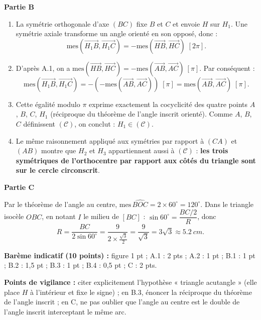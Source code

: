 \documentclass[11pt]{article}
\begin{document}
\begin{corrige}
\textbf{Partie B}
\begin{enumerate}
\item La symétrie orthogonale d'axe $(BC)$ fixe $B$ et $C$ et envoie $H$ sur $H_1$. Une symétrie axiale transforme un angle orienté en son opposé, donc :
\[ \mathrm{mes}(\overrightarrow{H_1B}, \overrightarrow{H_1C}) = -\mathrm{mes}(\overrightarrow{HB}, \overrightarrow{HC}) \; [2\pi]. \]
\item D'après A.1, on a $\mathrm{mes}(\overrightarrow{HB}, \overrightarrow{HC}) = -\mathrm{mes}(\overrightarrow{AB}, \overrightarrow{AC})\ [\pi]$. Par conséquent :
\[ \mathrm{mes}(\overrightarrow{H_1B}, \overrightarrow{H_1C}) = -(-\mathrm{mes}(\overrightarrow{AB}, \overrightarrow{AC})) \; [\pi] = \mathrm{mes}(\overrightarrow{AB}, \overrightarrow{AC}) \; [\pi]. \]
\item Cette égalité modulo $\pi$ exprime exactement la cocyclicité des quatre points $A$, $B$, $C$, $H_1$ (réciproque du théorème de l'angle inscrit orienté). Comme $A$, $B$, $C$ définissent $(\mathcal{C})$, on conclut : $\boxed{H_1 \in (\mathcal{C})}$.
\item Le même raisonnement appliqué aux symétries par rapport à $(CA)$ et $(AB)$ montre que $H_2$ et $H_3$ appartiennent aussi à $(\mathcal{C})$ : \textbf{les trois symétriques de l'orthocentre par rapport aux côtés du triangle sont sur le cercle circonscrit}.
\end{enumerate}

\textbf{Partie C}

Par le théorème de l'angle au centre, $\mathrm{mes}\,\widehat{BOC} = 2 \times 60^{\circ} = 120^{\circ}$. Dans le triangle isocèle $OBC$, en notant $I$ le milieu de $[BC]$ : $\sin 60^{\circ} = \dfrac{BC/2}{R}$, donc
\[ R = \frac{BC}{2\sin 60^{\circ}} = \frac{9}{2 \times \frac{\sqrt{3}}{2}} = \frac{9}{\sqrt{3}} = 3\sqrt{3} \approx \SI{5,2}{cm}. \]

\textbf{Barème indicatif (10 points) :} figure 1 pt ; A.1 : 2 pts ; A.2 : 1 pt ; B.1 : 1 pt ; B.2 : 1,5 pt ; B.3 : 1 pt ; B.4 : 0,5 pt ; C : 2 pts.

\textbf{Points de vigilance :} citer explicitement l'hypothèse « triangle acutangle » (elle place $H$ à l'intérieur et fixe le signe) ; en B.3, énoncer la réciproque du théorème de l'angle inscrit ; en C, ne pas oublier que l'angle au centre est le double de l'angle inscrit interceptant le même arc.
\end{corrige}
\end{document}
